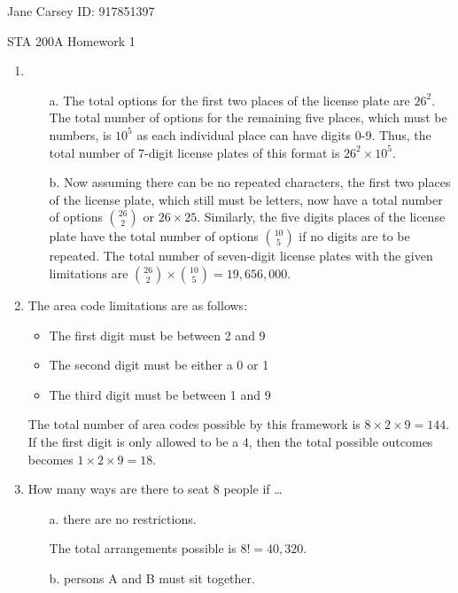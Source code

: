 \documentclass[letterpaper,12pt]{article}
\begin{document}
\begin{flushright} \large{Jane Carsey ID: 917851397} \end{flushright}
\large{STA 200A Homework 1} 


\begin{enumerate}

\item
\begin{enumerate}
\item[a.]
The total options for the first two places of the license plate are $26^2$. The total number of options for the remaining five places, which must be numbers, is $10^5$ as each individual place can have digits 0-9. Thus, the total number of 7-digit license plates of this format is $26^2 \times 10^5$.

\item[b.]
Now assuming there can be no repeated characters, the first two places of the license plate, which still must be letters, now have a total number of options $26 \choose 2$ or $26 \times 25$.
Similarly, the five digits places of the license plate have the total number of options $10 \choose 5$ if no digits are to be repeated.
The total number of seven-digit license plates with the given limitations are ${26 \choose 2} \times {10 \choose 5} = 19,656,000$.
\end{enumerate}


\item
The area code limitations are as follows:
\begin{itemize}
\item The first digit must be between 2 and 9
\item The second digit must be either a 0 or 1
\item The third digit must be between 1 and 9
\end{itemize}

The total number of area codes possible by this framework is $8 \times 2 \times 9 = 144$. If the first digit is only allowed to be a 4, then the total possible outcomes becomes $1 \times 2 \times 9 = 18$.


\item
How many ways are there to seat 8 people if \ldots
\begin{enumerate}
\item[a.] there are no restrictions.

The total arrangements possible is $8! = 40,320$.

\item[b.] persons A and B must sit together.


\end{enumerate}
\end{enumerate}
\end{document}
